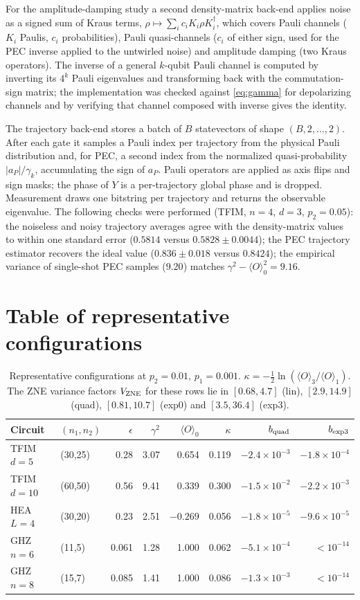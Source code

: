 \documentclass[aps,pra,reprint,amsmath,amssymb,nofootinbib,superscriptaddress]{revtex4-2}
\theoremstyle{remark}
\newcommand{\eps}{\epsilon}
\begin{document}
For the amplitude-damping study a second density-matrix back-end applies noise as a signed sum of Kraus terms, $\rho\mapsto\sum_i c_iK_i\rho K_i^\dagger$, which covers Pauli channels ($K_i$ Paulis, $c_i$ probabilities), Pauli quasi-channels ($c_i$ of either sign, used for the PEC inverse applied to the untwirled noise) and amplitude damping (two Kraus operators). The inverse of a general $k$-qubit Pauli channel is computed by inverting its $4^k$ Pauli eigenvalues and transforming back with the commutation-sign matrix; the implementation was checked against \cref{eq:gamma} for depolarizing channels and by verifying that channel composed with inverse gives the identity.

The trajectory back-end stores a batch of $B$ statevectors of shape $(B,2,\ldots,2)$. After each gate it samples a Pauli index per trajectory from the physical Pauli distribution and, for PEC, a second index from the normalized quasi-probability $|a_P|/\gamma_k$, accumulating the sign of $a_P$. Pauli operators are applied as axis flips and sign masks; the phase of $Y$ is a per-trajectory global phase and is dropped. Measurement draws one bitstring per trajectory and returns the observable eigenvalue. The following checks were performed (TFIM, $n=4$, $d=3$, $p_2=0.05$): the noiseless and noisy trajectory averages agree with the density-matrix values to within one standard error ($0.5814$ versus $0.5828\pm0.0044$); the PEC trajectory estimator recovers the ideal value ($0.836\pm0.018$ versus $0.8424$); the empirical variance of single-shot PEC samples ($9.20$) matches $\gamma^2-\langle O\rangle_0^2=9.16$.

\section{Table of representative configurations}
\begin{table}[t]
\centering\small
\begin{tabular}{llrrrrrr}
\toprule
Circuit & $(n_1,n_2)$ & $\eps$ & $\gamma^2$ & $\langle O\rangle_0$ & $\kappa$ & $b_{\rm quad}$ & $b_{\rm exp3}$\\
\midrule
TFIM $d=5$ & (30,25) & 0.28 & 3.07 & 0.654 & 0.119 & $-2.4\times10^{-3}$ & $-1.8\times10^{-4}$\\
TFIM $d=10$ & (60,50) & 0.56 & 9.41 & 0.339 & 0.300 & $-1.5\times10^{-2}$ & $-2.2\times10^{-3}$\\
HEA $L=4$ & (30,20) & 0.23 & 2.51 & $-0.269$ & 0.056 & $-1.8\times10^{-5}$ & $-9.6\times10^{-5}$\\
GHZ $n=6$ & (11,5) & 0.061 & 1.28 & 1.000 & 0.062 & $-5.1\times10^{-4}$ & $<10^{-14}$\\
GHZ $n=8$ & (15,7) & 0.085 & 1.41 & 1.000 & 0.086 & $-1.3\times10^{-3}$ & $<10^{-14}$\\
\bottomrule
\end{tabular}
\caption{Representative configurations at $p_2=0.01$, $p_1=0.001$. $\kappa=-\frac12\ln(\langle O\rangle_3/\langle O\rangle_1)$. The ZNE variance factors $V_{\rm ZNE}$ for these rows lie in $[0.68,4.7]$ (lin), $[2.9,14.9]$ (quad), $[0.81,10.7]$ (exp0) and $[3.5,36.4]$ (exp3).}
\end{table}



\end{document}
